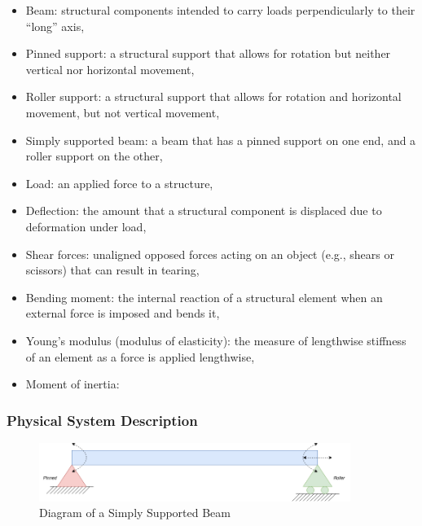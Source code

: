 \documentclass[12pt]{article}
\begin{document}
\begin{itemize}

    \item Beam: structural components intended to carry loads perpendicularly to
        their ``long'' axis,

    \item Pinned support: a structural support that allows for rotation but
        neither vertical nor horizontal movement,

    \item Roller support: a structural support that allows for rotation and
        horizontal movement, but not vertical movement,

    \item Simply supported beam: a beam that has a pinned support on one end,
        and a roller support on the other,

    \item Load: an applied force to a structure,

    \item Deflection: the amount that a structural component is displaced due to
        deformation under load,

    \item Shear forces: unaligned opposed forces acting on an object (e.g.,
        shears or scissors) that can result in tearing,

    \item Bending moment: the internal reaction of a structural element when an
    external force is imposed and bends it,

    \item Young's modulus (modulus of elasticity): the measure of lengthwise
    stiffness of an element as a force is applied lengthwise\needscitation{},

    \item Moment of inertia:

\end{itemize}

\subsubsection{Physical System Description} \label{sec_phySystDescrip}

\begin{figure}[H]
    \begin{center}
        \includegraphics[width=0.9\textwidth]{temp/beam_bending_diagram.drawio.png}
        \caption{\label{beam_bending_diagram} Diagram of a Simply Supported Beam}
    \end{center}
\end{figure}
\end{document}
